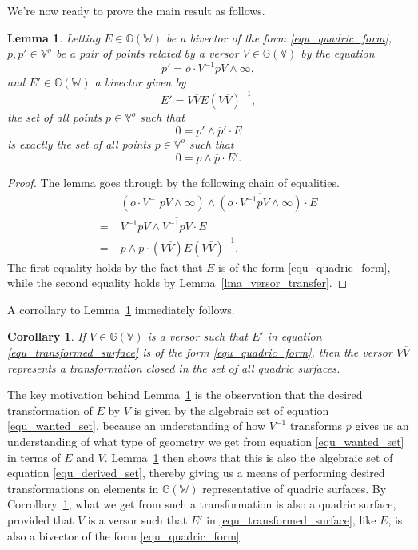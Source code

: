 \documentclass{birkjour}
\newtheorem{cor}[thm]{Corollary}
\newtheorem{lem}[thm]{Lemma}
\theoremstyle{definition}
\theoremstyle{remark}
\numberwithin{equation}{section}
\newcommand{\G}{\mathbb{G}}
\newcommand{\V}{\mathbb{V}}
\newcommand{\W}{\mathbb{W}}
\newcommand{\nvao}{o}
\newcommand{\nvai}{\infty}
\begin{document}
We're now ready to prove the main result as follows.
\begin{lem}\label{lma_quadric_transform}
Letting $E\in\G(\W)$ be a bivector of the form \eqref{equ_quadric_form},
$p,p'\in\V^o$ be a pair of points related by a versor $V\in\G(\V)$ by
the equation
\begin{equation}\label{equ_get_rid_ni}
p' = \nvao\cdot V^{-1}pV\wedge\nvai,
\end{equation}
and $E'\in\G(\W)$ a bivector given by
\begin{equation}\label{equ_transformed_surface}
E' = V\overline{V}E(V\overline{V})^{-1},
\end{equation}
the set of all points $p\in\V^\nvao$ such that
\begin{equation}\label{equ_wanted_set}
0 = p'\wedge\overline{p}'\cdot E
\end{equation}
is exactly the set of all points $p\in\V^\nvao$ such that
\begin{equation}\label{equ_derived_set}
0 = p\wedge\overline{p}\cdot E'.
\end{equation}
\end{lem}
\begin{proof}
The lemma goes through by the following chain of equalities.
\begin{align}
 & (\nvao\cdot V^{-1}pV\wedge\nvai)\wedge\overline{(\nvao\cdot V^{-1}pV\wedge\nvai)}\cdot E \\
=\;& V^{-1}pV\wedge\overline{V^{-1}pV}\cdot E \\
=\;& p\wedge\overline{p}\cdot(V\overline{V})E(V\overline{V})^{-1}.
\end{align}
The first equality holds by the fact that $E$ is of the form \eqref{equ_quadric_form},
while the second equality holds by Lemma~\ref{lma_versor_transfer}.
\end{proof}
A corrollary to Lemma~\ref{lma_quadric_transform} immediately follows.
\begin{cor}\label{cor_quadric_transform}
If $V\in\G(\V)$ is a versor such that $E'$ in equation \eqref{equ_transformed_surface}
is of the form \eqref{equ_quadric_form}, then the versor $V\overline{V}$
represents a transformation closed in the set of all quadric surfaces.
\end{cor}

The key motivation behind Lemma~\ref{lma_quadric_transform} is
the observation that the desired transformation of $E$ by $V$ is
given by the algebraic set of equation \eqref{equ_wanted_set}, because
an understanding of how $V^{-1}$ transforms $p$ gives us an understanding
of what type of geometry we get from equation \eqref{equ_wanted_set} in terms of
$E$ and $V$.  Lemma~\ref{lma_quadric_transform} then
shows that this is also the algebraic set of equation \eqref{equ_derived_set}, thereby
giving us a means of performing desired transformations on elements in $\G(\W)$ representative
of quadric surfaces.
By Corrollary~\ref{cor_quadric_transform}, what we get
from such a transformation is also a quadric surface, provided that $V$ is a
versor such that $E'$
in \eqref{equ_transformed_surface}, like $E$, is also a bivector of the form \eqref{equ_quadric_form}.
\end{document}
